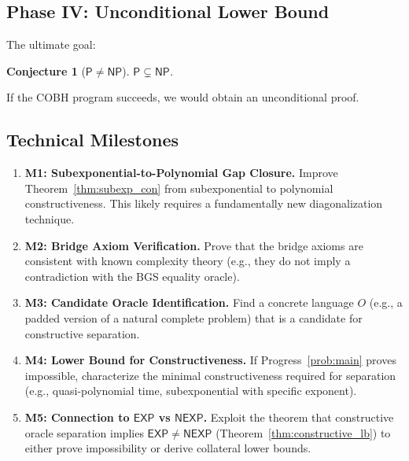 \documentclass[11pt,a4paper]{article}
\theoremstyle{plain}
\newtheorem{conjecture}[theorem]{Conjecture}
\theoremstyle{definition}
\theoremstyle{remark}
\newcommand{\PP}{\mathsf{P}}
\newcommand{\NP}{\mathsf{NP}}
\newcommand{\EXP}{\mathsf{EXP}}
\newcommand{\NEXP}{\mathsf{NEXP}}
\begin{document}
\subsection{Phase IV: Unconditional Lower Bound}

The ultimate goal:

\begin{conjecture}[$\PP \neq \NP$]\label{conj:pnp}
$\PP \subsetneq \NP$.
\end{conjecture}

If the COBH program succeeds, we would obtain an unconditional proof.

\subsection{Technical Milestones}

\begin{enumerate}[label=\textbf{M\arabic*}.]
    \item \textbf{M1: Subexponential-to-Polynomial Gap Closure.}
    Improve Theorem~\ref{thm:subexp_con} from subexponential to polynomial
    constructiveness.  This likely requires a fundamentally new diagonalization
    technique.

    \item \textbf{M2: Bridge Axiom Verification.}
    Prove that the bridge axioms are consistent with known complexity theory
    (e.g., they do not imply a contradiction with the BGS equality oracle).

    \item \textbf{M3: Candidate Oracle Identification.}
    Find a concrete language $O$ (e.g., a padded version of a natural complete
    problem) that is a candidate for constructive separation.

    \item \textbf{M4: Lower Bound for Constructiveness.}
    If Progress~\ref{prob:main} proves impossible, characterize the minimal
    constructiveness required for separation (e.g., quasi-polynomial time,
    subexponential with specific exponent).

    \item \textbf{M5: Connection to $\EXP$ vs $\NEXP$.}
    Exploit the theorem that constructive oracle separation implies
    $\EXP \neq \NEXP$ (Theorem~\ref{thm:constructive_lb}) to either prove
    impossibility or derive collateral lower bounds.
\end{enumerate}

\end{document}

